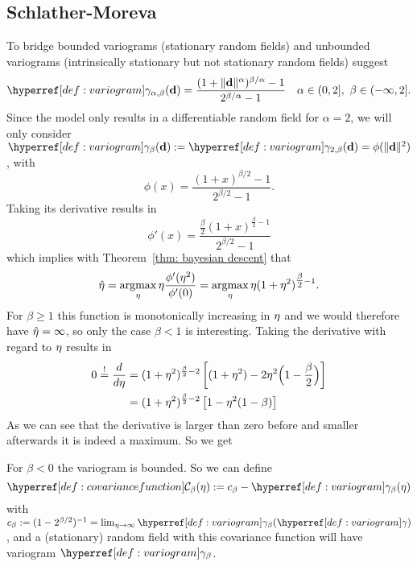 
\subsection{Schlather-Moreva}

To bridge bounded variograms (stationary random fields) and
unbounded variograms (intrinsically stationary but not stationary random fields)
\textcite{schlatherParametricModelBridging2017} suggest
\begin{equation*}
	\variogram_{\alpha,\beta}(\step)
	= \frac{(1+\|\step\|^\alpha)^{\beta/\alpha}-1}{2^{\beta/\alpha}-1}
	\quad \alpha\in (0,2],\ \beta\in(-\infty, 2].
\end{equation*}
Since the model only results in a differentiable random field for \(\alpha=2\),
we will only consider \(\variogram_\beta(\step) := \variogram_{2,\beta}(\step) = \phi(\|\step\|^2)\),
with
\begin{equation*}
	\phi(x) = \frac{(1+x)^{\beta/2} -1}{2^{\beta/2}-1}.
\end{equation*}
Taking its derivative results in
\begin{equation*}
	\phi'(x) = \frac{\tfrac\beta2 (1+x)^{\tfrac\beta2 -1}}{2^{\beta/2}-1}
\end{equation*}
which implies with Theorem~\ref{thm: bayesian descent} that
\begin{align*}
	\hat{\eta} = \operatorname*{argmax}_\eta \eta\frac{\phi'(\eta^2)}{\phi'(0)}
	= \operatorname*{argmax}_\eta \eta(1+\eta^2)^{\tfrac\beta2 -1}.
\end{align*}
For \(\beta \ge 1\) this function is monotonically increasing in \(\eta\) and
we would therefore have \(\hat{\eta} = \infty\), so only the case \(\beta <1\)
is interesting. Taking the derivative with regard to
\(\eta\) results in
\begin{align*}
	0 \overset!=\frac{d}{d\eta}
	&= (1+\eta^2)^{\frac\beta2 -2} \left[(1+\eta^2) - 2\eta^2\Big(1-\frac\beta2\Big)\right]\\
	&= (1+\eta^2)^{\frac\beta2 -2} \left[1 - \eta^2(1-\beta)\right]
\end{align*}
As we can see that the derivative is larger than zero before and smaller
afterwards it is indeed a maximum.
So we get


For \(\beta<0\) the variogram is bounded. So we can define
\[
	\C_\beta(\lr) := c_\beta - \variogram_\beta(\lr)
\]
with \(c_\beta := (1-2^{\beta/2})^{-1} =
\lim_{\lr\to\infty}\variogram_\beta(\variogram)\), and a (stationary) random
field with this covariance function will have variogram \(\variogram_\beta\).

